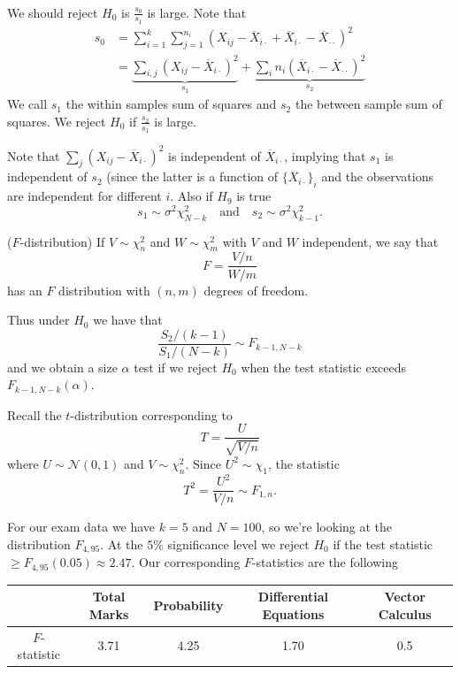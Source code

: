 \documentclass{article}
\begin{document}
\begin{example}
\begin{align*}
  \end{align*}
  We should reject $ H_0 $ is $ \frac{s_0}{s_1} $ is large. Note that
  \begin{align*}
	  s_0 &= \sum_{i=1}^k\sum_{j=1}^{n_i} (X_{ij}-\overline X_{i\cdot} + \overline X_{i\cdot} - \overline X_{\cdot\cdot})^2 \\
	      &=\underbrace{\sum_{i,j}(X_{ij}-\overline X_{i\cdot})^2}_{s_1}+\underbrace{\sum_i n_i(\overline X_{i\cdot} - \overline X_{\cdot\cdot})^2}_{s_2}
  \end{align*}
  We call $ s_1 $ the within samples sum of squares and $ s_2 $ the between sample sum of squares. We reject $ H_0 $ if $ \frac{s_2}{s_1} $ is large.\par
  Note that $ \sum_j(X_{ij}-\overline X_{i\cdot})^2 $ is independent of $ \overline X_{i\cdot} $, implying that $ s_1 $ is independent of $ s_2 $ (since the latter is a function of $ \{\overline X_{i\cdot}\}_i $ and the observations are independent for different $ i $. Also if $ H_9 $ is true
  \[
	  s_1\sim \sigma^2 \chi^2_{N-k} \quad \text{and} \quad s_2 \sim \sigma^2 \chi^2_{k-1}.
  \]
\begin{definition}
	($ F $-distribution) If $ V\sim \chi^2_n $ and $ W\sim \chi^2_m $ with $ V $ and $ W $ independent, we say that
	\[
		F = \frac{V/n}{W/m}
	\]
	has an $ F $ distribution with $ (n,m) $ degrees of freedom.
\end{definition}
Thus under $ H_0 $ we have that
\[
	\frac{S_2/(k-1)}{S_1/(N-k)} \sim F_{k-1,N-k}
\]
and we obtain a size $ \alpha $ test if we reject $ H_0 $ when the test statistic exceeds $ F_{k-1,N-k}(\alpha) $.
\begin{remark}
  Recall the $ t $-distribution corresponding to
  \[
	  T = \frac{U}{\sqrt{V/n}}
  \]
  where $ U\sim \mathcal N(0,1) $ and $ V\sim \chi^2_n $. Since $ U^2\sim \chi_1 $, the statistic
  \[
	  T^2 = \frac{U^2}{V/n}\sim F_{1,n}.
  \]
\end{remark}
For our exam data we have $ k=5 $ and $ N=100 $, so we're looking at the distribution $ F_{4,95} $. At the $ 5\% $ significance level we reject $ H_0 $ if the test statistic $ \ge F_{4,95}(0.05)\approx 2.47 $. Our corresponding $ F $-statistics are the following
\begin{center}
	\begin{tabular}{|c | c c c c|}
		\hline
		& Total Marks & Probability & Differential Equations & Vector Calculus \\
		\hline
		$ F $-statistic & 3.71 & 4.25 & 1.70 & 0.5 \\

\end{tabular}
\end{center}
\end{example}
\end{document}
